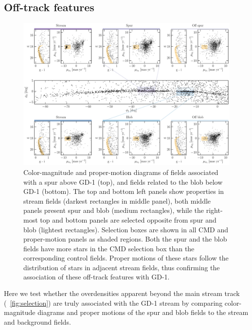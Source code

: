\documentclass[modern]{aastex62}
\newcommand{\gaia}{\textsl{Gaia}}
\begin{document}
\subsection{Off-track features}
\label{sec:res_gap}

\begin{figure}
\begin{center}
\includegraphics[width=\textwidth]{features.pdf}
\end{center}
\caption{
Color-magnitude and proper-motion diagrams of fields associated with a spur above GD-1 (top), and fields related to the blob below GD-1 (bottom).
The top and bottom left panels show properties in stream fields (darkest rectangles in middle panel), both middle panels present spur and blob (medium rectangles), while the right-most top and bottom panels are selected opposite from spur and blob (lightest rectangles).
Selection boxes are shown in all CMD and proper-motion panels as shaded regions.
Both the spur and the blob fields have more stars in the CMD selection box than the corresponding control fields.
Proper motions of these stars follow the distribution of stars in adjacent stream fields, thus confirming the association of these off-track features with GD-1.
}
\label{fig:features}
\end{figure}

Here we test whether the overdensities apparent beyond the main stream track
(\figurename~\ref{fig:selection}) are truly associated with the GD-1 stream by
comparing color-magnitude diagrams and proper motions of the spur and blob
fields to the stream and background fields.
\end{document}
